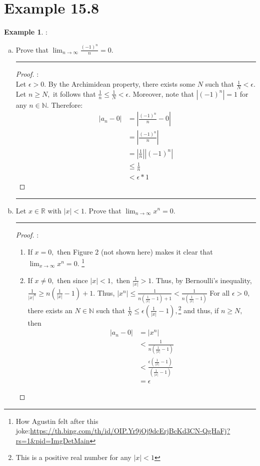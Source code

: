 \documentclass[openany, amssymb, psamsfonts]{amsart}
\newcommand{\bbN}{\mathbb{N}}
\newcommand{\bbR}{\mathbb{R}}
\newcommand{\abs}[1]{\lvert #1 \rvert}
\theoremstyle{definition}
\newtheorem{exmp}{Example}[section]
\numberwithin{equation}{section}
\begin{document}
\section*{Example 15.8}
\begin{exmp} :\\
\label{15.8}
	\begin{enumerate}[(a)]
		\item Prove that $\displaystyle \lim_{n \to \infty} \frac{(-1)^n}{n} = 0$.
  \vspace{4pt}     \hrule   \vspace{4pt}\begin{proof}:\\
  Let $\epsilon>0.$ By the Archimidean property, there exists some $N$ such that  $\frac{1}{N}< \epsilon.$ Let $n\geq N,$ it follows that $\frac{1}{n}\leq \frac{1}{N}< \epsilon.$ Moreover, note that $|(-1)^n| = 1$ for any $n\in \bbN.$ Therefore:
  \begin{align*}
  |a_n - 0| &= |\frac{(-1)^n}{n} - 0|\\
  &= |\frac{(-1)^n}{n}|\\
  &= |\frac{1}{n}||(-1)^n|\\
  &\leq \frac{1}{n}\\
  &< \epsilon *1
  \end{align*}
  \end{proof}  \vspace{4pt}     \hrule   \vspace{4pt}
		\item Let $x \in \bbR$ with $\abs{x} < 1$. Prove that $\displaystyle \lim_{n \to \infty} x^n = 0$. 
  \vspace{4pt}     \hrule   \vspace{4pt} \begin{proof}:\\
\begin{enumerate}
\item If $x = 0,$ then Figure 2 (not shown here) makes it clear that $\displaystyle\lim_{x\to \infty}x^n = 0.$ \footnote{How Agustin felt after this joke:\newline \url{https://th.bing.com/th/id/OIP.Yr9jOj9dcErjBcKd3CN-QgHaFj?rs=1&pid=ImgDetMain}}
\item If $x\neq 0,$ then since $|x|<1,$ then $\frac{1}{|x|}>1.$ Thus, by Bernoulli's inequality, $\frac{1}{|x|^n} \geq n(\frac{1}{|x|}-1) + 1.$ Thus, $|x^n|\leq \frac{1}{n(\frac{1}{|x|}-1) + 1}<\frac{1}{n(\frac{1}{|x|}-1)}$ For all $\epsilon>0,$ there exists an $N\in \bbN$ such that $\frac{1}{N}\leq \epsilon(\frac{1}{|x|}-1),$\footnote{This is a positive real number for any $|x|<1$} and thus, if $n\geq N,$ then 
\begin{align*}
|a_n - 0| &= |x^n|\\
&< \frac{1}{n(\frac{1}{|x|}-1)}\\
&< \frac{\epsilon(\frac{1}{|x|}-1)}{(\frac{1}{|x|}-1)}\\
&= \epsilon
\end{align*}
\end{enumerate}


\end{proof}
\end{enumerate}
\end{exmp}
\end{document}
